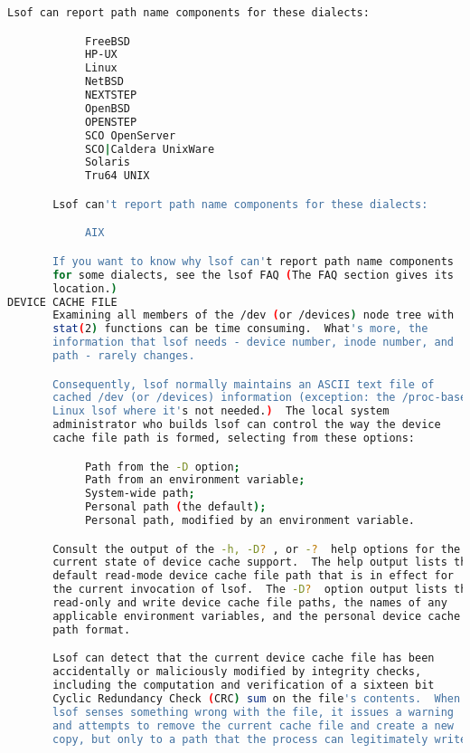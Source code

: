 {{\begin{lstlisting}[language=bash]
       Lsof can report path name components for these dialects:

            FreeBSD
            HP-UX
            Linux
            NetBSD
            NEXTSTEP
            OpenBSD
            OPENSTEP
            SCO OpenServer
            SCO|Caldera UnixWare
            Solaris
            Tru64 UNIX

       Lsof can't report path name components for these dialects:

            AIX

       If you want to know why lsof can't report path name components
       for some dialects, see the lsof FAQ (The FAQ section gives its
       location.)
DEVICE CACHE FILE
       Examining all members of the /dev (or /devices) node tree with
       stat(2) functions can be time consuming.  What's more, the
       information that lsof needs - device number, inode number, and
       path - rarely changes.

       Consequently, lsof normally maintains an ASCII text file of
       cached /dev (or /devices) information (exception: the /proc-based
       Linux lsof where it's not needed.)  The local system
       administrator who builds lsof can control the way the device
       cache file path is formed, selecting from these options:

            Path from the -D option;
            Path from an environment variable;
            System-wide path;
            Personal path (the default);
            Personal path, modified by an environment variable.

       Consult the output of the -h, -D? , or -?  help options for the
       current state of device cache support.  The help output lists the
       default read-mode device cache file path that is in effect for
       the current invocation of lsof.  The -D?  option output lists the
       read-only and write device cache file paths, the names of any
       applicable environment variables, and the personal device cache
       path format.

       Lsof can detect that the current device cache file has been
       accidentally or maliciously modified by integrity checks,
       including the computation and verification of a sixteen bit
       Cyclic Redundancy Check (CRC) sum on the file's contents.  When
       lsof senses something wrong with the file, it issues a warning
       and attempts to remove the current cache file and create a new
       copy, but only to a path that the process can legitimately write.


\end{lstlisting}}}
